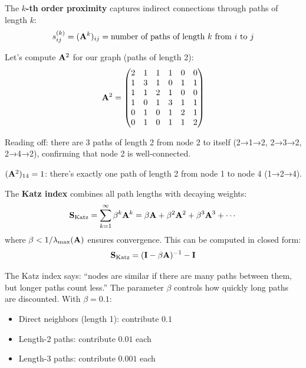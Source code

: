 \begin{notechapter}
\begin{definition}
The \textbf{$k$-th order proximity} captures indirect connections through paths of length $k$:
\[
s^{(k)}_{ij} = (\mathbf{A}^k)_{ij} = \text{number of paths of length } k \text{ from } i \text{ to } j
\]
\end{definition}

\begin{example}
Let's compute $\mathbf{A}^2$ for our graph (paths of length 2):
\[
\mathbf{A}^2 = \begin{pmatrix}
2 & 1 & 1 & 1 & 0 & 0 \\
1 & 3 & 1 & 0 & 1 & 1 \\
1 & 1 & 2 & 1 & 0 & 0 \\
1 & 0 & 1 & 3 & 1 & 1 \\
0 & 1 & 0 & 1 & 2 & 1 \\
0 & 1 & 0 & 1 & 1 & 2
\end{pmatrix}
\]

Reading off: there are 3 paths of length 2 from node 2 to itself (2→1→2, 2→3→2, 2→4→2), confirming that node 2 is well-connected.

$(\mathbf{A}^2)_{14} = 1$: there's exactly one path of length 2 from node 1 to node 4 (1→2→4).
\end{example}

\begin{definition}
The \textbf{Katz index} combines all path lengths with decaying weights:
\[
\mathbf{S}_{\text{Katz}} = \sum_{k=1}^{\infty} \beta^k \mathbf{A}^k = \beta\mathbf{A} + \beta^2\mathbf{A}^2 + \beta^3\mathbf{A}^3 + \cdots
\]
where $\beta < 1/\lambda_{\max}(\mathbf{A})$ ensures convergence. This can be computed in closed form:
\[
\mathbf{S}_{\text{Katz}} = (\mathbf{I} - \beta\mathbf{A})^{-1} - \mathbf{I}
\]
\end{definition}

\begin{intuition}
The Katz index says: ``nodes are similar if there are many paths between them, but longer paths count less.'' The parameter $\beta$ controls how quickly long paths are discounted. With $\beta = 0.1$:
\begin{itemize}
    \item Direct neighbors (length 1): contribute $0.1$
    \item Length-2 paths: contribute $0.01$ each
    \item Length-3 paths: contribute $0.001$ each
\end{itemize}
\end{intuition}



\end{notechapter}
